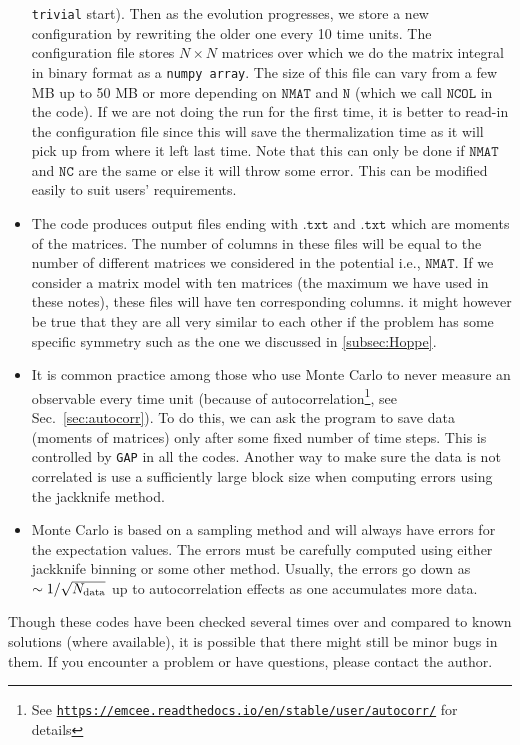 \documentclass[letter,11pt]{article}
\begin{document}
\begin{itemize}
\texttt{trivial} start). Then as the evolution progresses, we store a new configuration by rewriting the older one every 10 time units. The configuration file stores $N \times N$ matrices over which we do the matrix integral 
in binary format as a \texttt{numpy array}. 
The size of this file can vary from a few MB up to 50 MB or more depending on 
$\texttt{NMAT}$ and $\texttt{N}$ (which we call $\texttt{NCOL}$ in the code). If we are not doing the run for the first time, it is better to read-in the configuration file since this will save the thermalization time as it will pick up from where it left last time.  
Note that this can only be done if $\texttt{NMAT}$ and $\texttt{NC}$ are the same or else
it will throw some error. This can be modified easily to suit users' requirements. 
\item The code produces output files ending with $\texttt{.txt}$ and $\texttt{.txt}$
which are moments of the matrices. The number of columns in these files will be equal to 
the number of different matrices we considered in the potential i.e., $\texttt{NMAT}$. 
If we consider a matrix model with ten matrices (the maximum we have used in these notes),
these files will have ten corresponding columns. it might however be true that they are all very similar to each other if the problem has some specific symmetry such as the one we discussed in \ref{subsec:Hoppe}.
\item It is common practice among those who use Monte Carlo to never measure an 
observable every time unit (because of autocorrelation\footnote{See 
\texttt{\href{https://emcee.readthedocs.io/en/stable/user/autocorr/}{https://emcee.readthedocs.io/en/stable/user/autocorr/}}
for details}, see Sec.~\ref{sec:autocorr}). 
To do this, we can ask the program to save data (moments of matrices) only after some fixed number of time steps. This is controlled by \texttt{GAP} in all the codes. Another way to make sure the data is not correlated is use a sufficiently large block size when computing errors using the jackknife method. 
\item Monte Carlo is based on a sampling method and will always have errors for the expectation values. The errors must be carefully computed using either jackknife binning or some other method. Usually, the errors go down as $ \sim 1/\sqrt{N_{\rm{data}}}$ up to autocorrelation effects 
as one accumulates more data. 
\end{itemize} 
Though these codes have been checked several times over and compared to known solutions (where available), 
it is possible that there might still be minor bugs in them. If you encounter a problem or have questions, please contact the author. 
\vspace{8mm}
\end{document}
